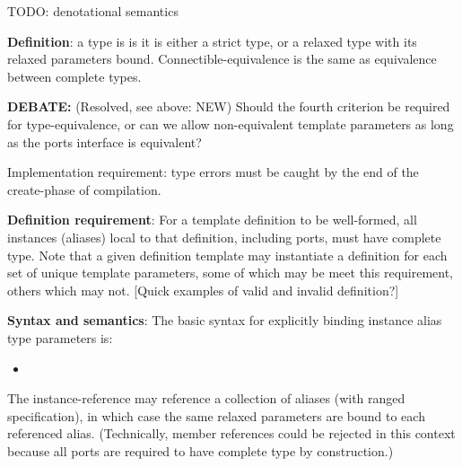 TODO: denotational semantics

\begin{comment}
\textbf{OUTDATED:}
Two templated types are equivalence if and only if:
\begin{itemize}
\item They are of the same type class (channel, process,... ), obviously
\item They refer to the same base definition.  
\item The port types and dimensions are type-equivalent.  
\item Their template arguments are equal.  
\end{itemize}

The third and fourth criteria are not necessary equivalent.  
The ports of a template definition need not depend on template
parameters themselves, as is the case with defining 
cyclic source sequences for a channel.  
\end{comment}

\textbf{Definition}:
a type is  is it is either a strict type, 
or a relaxed type with its relaxed parameters bound.  
Connectible-equivalence is the same as equivalence between complete types.  

\textbf{DEBATE:} (Resolved, see above: NEW)
Should the fourth criterion be required for type-equivalence, 
or can we allow non-equivalent template parameters as long as the
ports interface is equivalent?  

Implementation requirement:
type errors must be caught by the end of the create-phase of compilation.

\textbf{Definition requirement}:
For a template definition to be well-formed, 
all instances (aliases) local to that definition, including ports, 
must have complete type. 
Note that a given definition template may instantiate a definition
for each set of unique template parameters, some of which may
be meet this requirement, others which may not.  
[Quick examples of valid and invalid definition?]

\textbf{Syntax and semantics}:
The basic syntax for explicitly binding instance alias type parameters is:
\begin{itemize}
\item {} \ttt{<}  \ttt{>}
\end{itemize}
\noindent
The instance-reference may reference a collection of aliases 
(with ranged specification), in which case the same relaxed parameters are
bound to each referenced alias.  
(Technically, member references could be rejected in this context 
because all ports are required to have complete type by construction.)

